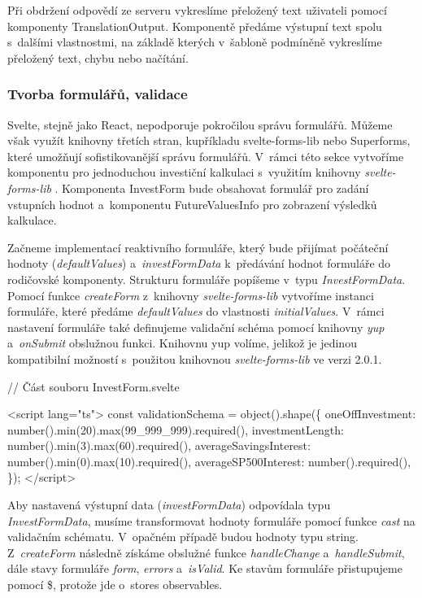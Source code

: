 Při obdržení odpovědí ze serveru vykreslíme přeložený text uživateli pomocí komponenty TranslationOutput. 
Komponentě předáme výstupní text spolu s~dalšími vlastnostmi, na základě kterých v~šabloně podmíněně vykreslíme přeložený text, chybu nebo načítání.

\subsubsection*{Tvorba formulářů, validace}

Svelte, stejně jako React, nepodporuje pokročilou správu formulářů. Můžeme však využít knihovny třetích stran, kupříkladu svelte-forms-lib nebo Superforms, které umožňují sofistikovanější správu formulářů. 
V~rámci této sekce vytvoříme komponentu pro jednoduchou investiční kalkulaci s~využitím knihovny \emph{svelte-forms-lib} \cite{svelteformslib}. 
Komponenta InvestForm bude obsahovat formulář pro zadání vstupních hodnot a~komponentu FutureValuesInfo pro zobrazení výsledků kalkulace.

Začneme implementací reaktivního formuláře, který bude přijímat počáteční hodnoty (\emph{defaultValues}) a~\emph{investFormData} k~předávání hodnot formuláře do rodičovské komponenty. 
Strukturu formuláře popíšeme v~typu \emph{InvestFormData}. Pomocí funkce \emph{createForm} z~knihovny \emph{svelte-forms-lib} vytvoříme instanci formuláře, které předáme \emph{defaultValues} do vlastnosti \emph{initialValues}. 
V~rámci nastavení formuláře také definujeme validační schéma pomocí knihovny \emph{yup} \cite{yuplibrary} a~\emph{onSubmit} obslužnou funkci. 
Knihovnu yup volíme, jelikož je jedinou kompatibilní možností s~použitou knihovnou \emph{svelte-forms-lib} ve verzi 2.0.1. 

\begin{prog}
// Část souboru InvestForm.svelte

<script lang="ts">
  const validationSchema = object().shape(\{
    oneOffInvestment: number().min(20).max(99_999_999).required(),
    investmentLength: number().min(3).max(60).required(),
    averageSavingsInterest: number().min(0).max(10).required(),
    averageSP500Interest: number().required(),
  \});
</script>
\end{prog}

Aby nastavená výstupní data (\emph{investFormData}) odpovídala typu \emph{InvestFormData}, musíme transformovat hodnoty formuláře pomocí funkce \emph{cast} na validačním schématu. V~opačném případě budou hodnoty typu string. 
Z~\emph{createForm} následně získáme obslužné funkce \emph{handleChange} a~\emph{handleSubmit}, dále stavy formuláře \emph{form}, \emph{errors} a~\emph{isValid}. Ke stavům formuláře přistupujeme pomocí \$, protože jde o~stores observables.

